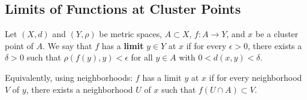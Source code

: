 \subsection{Limits of Functions at Cluster Points}
\begin{definition}
    Let $(X,d)$ and $(Y,\rho)$ be metric spaces, $A \subset X$, $f: A \rightarrow Y$, and $x$ be a cluster point of $A$. We say that $f$ has a \textbf{limit} $y \in Y$ at $x$ if for every $\epsilon > 0$, there exists a $\delta > 0$ such that $\rho(f(y),y) < \epsilon$ for all $y \in A$ with $0 < d(x,y) < \delta$.

    Equivalently, using neighborhoods: $f$ has a limit $y$ at $x$ if for every neighborhood $V$ of $y$, there exists a neighborhood $U$ of $x$ such that $f(U \cap A) \subset V$.
\end{definition}
%







